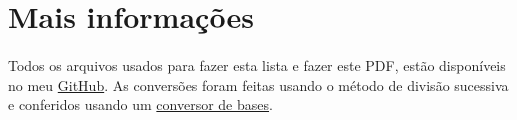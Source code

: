 \documentclass{article}
\begin{document}
\section{Mais informações}
\paragraph{}Todos os arquivos usados para fazer esta lista e fazer este PDF, estão disponíveis no meu \href{https://github.com/gpgp2006/LaTeX/}{GitHub}. As conversões foram feitas usando o método de divisão sucessiva e conferidos usando um \href{https://www.rapidtables.com/convert/number/decimal-to-binary.html}{conversor de bases}.
\end{document}
